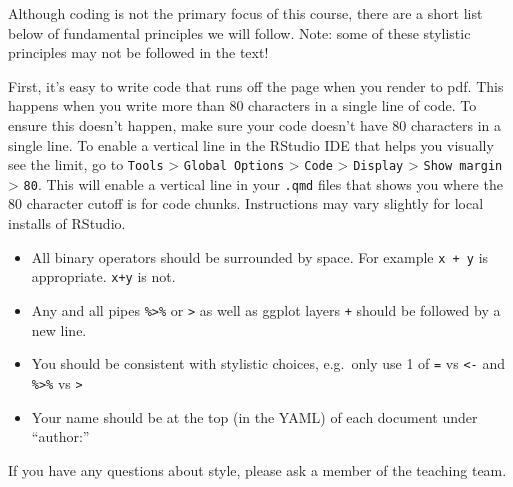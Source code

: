 \documentclass[
  letterpaper,
  DIV=11,
  numbers=noendperiod]{scrartcl}
\begin{document}
Although coding is not the primary focus of this course, there are a
short list below of fundamental principles we will follow. Note: some of
these stylistic principles may not be followed in the text!

First, it's easy to write code that runs off the page when you render to
pdf. This happens when you write more than 80 characters in a single
line of code. To ensure this doesn't happen, make sure your code doesn't
have 80 characters in a single line. To enable a vertical line in the
RStudio IDE that helps you visually see the limit, go to \texttt{Tools}
\textgreater{} \texttt{Global\ Options} \textgreater{} \texttt{Code}
\textgreater{} \texttt{Display} \textgreater{} \texttt{Show\ margin}
\textgreater{} \texttt{80}. This will enable a vertical line in your
\texttt{.qmd} files that shows you where the 80 character cutoff is for
code chunks. Instructions may vary slightly for local installs of
RStudio.

\begin{itemize}
\item
  All binary operators should be surrounded by space. For example
  \texttt{x\ +\ y} is appropriate. \texttt{x+y} is not.
\item
  Any and all pipes \texttt{\%\textgreater{}\%} or
  \texttt{\textbar{}\textgreater{}} as well as ggplot layers \texttt{+}
  should be followed by a new line.
\item
  You should be consistent with stylistic choices, e.g.~only use 1 of
  \texttt{=} vs \texttt{\textless{}-} and \texttt{\%\textgreater{}\%} vs
  \texttt{\textbar{}\textgreater{}}
\item
  Your name should be at the top (in the YAML) of each document under
  ``author:''
\end{itemize}

If you have any questions about style, please ask a member of the
teaching team.
\end{document}
